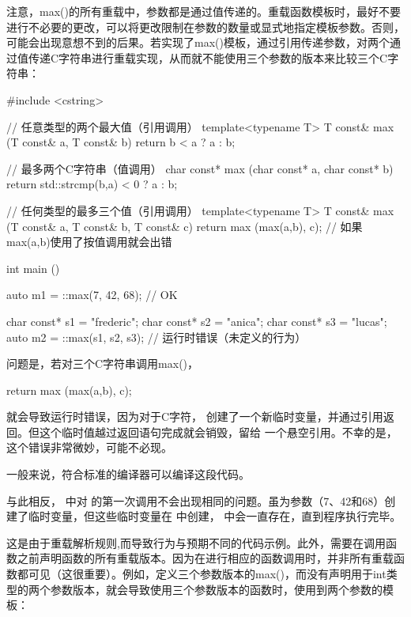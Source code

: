 注意，max()的所有重载中，参数都是通过值传递的。重载函数模板时，最好不要进行不必要的更改，可以将更改限制在参数的数量或显式地指定模板参数。否则，可能会出现意想不到的后果。若实现了max()模板，通过引用传递参数，对两个通过值传递C字符串进行重载实现，从而就不能使用三个参数的版本来比较三个C字符串：

\begin{cpp}
#include <cstring>

// 任意类型的两个最大值（引用调用）
template<typename T>
T const& max (T const& a, T const& b) {
	return b < a ? a : b;
}

// 最多两个C字符串（值调用）
char const* max (char const* a, char const* b) {
	return std::strcmp(b,a) < 0 ? a : b;
}

// 任何类型的最多三个值（引用调用）
template<typename T>
T const& max (T const& a, T const& b, T const& c) {
	return max (max(a,b), c); // 如果max(a,b)使用了按值调用就会出错
}

int main () {
	auto m1 = ::max(7, 42, 68); // OK
	
	char const* s1 = "frederic";
	char const* s2 = "anica";
	char const* s3 = "lucas";
	auto m2 = ::max(s1, s2, s3); // 运行时错误（未定义的行为）
}
\end{cpp}

问题是，若对三个C字符串调用max()，

\begin{cpp}
return max (max(a,b), c);
\end{cpp}

就会导致运行时错误，因为对于C字符， 创建了一个新临时变量，并通过引用返回。但这个临时值越过返回语句完成就会销毁，留给  一个悬空引用。不幸的是，这个错误非常微妙，可能不必现。

\begin{notice}
一般来说，符合标准的编译器可以编译这段代码。
\end{notice}

与此相反， 中对  的第一次调用不会出现相同的问题。虽为参数（7、42和68）创建了临时变量，但这些临时变量在  中创建， 中会一直存在，直到程序执行完毕。

这是由于重载解析规则,而导致行为与预期不同的代码示例。此外，需要在调用函数之前声明函数的所有重载版本。因为在进行相应的函数调用时，并非所有重载函数都可见（这很重要）。例如，定义三个参数版本的max()，而没有声明用于int类型的两个参数版本，就会导致使用三个参数版本的函数时，使用到两个参数的模板：

